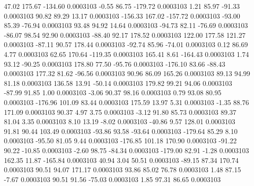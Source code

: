        47.02      175.67     -134.60     0.0003103
       -0.55       86.75     -179.72     0.0003103
        1.21       85.97      -91.33     0.0003103
       90.82       89.29       13.17     0.0003103
     -156.33      167.02     -157.72     0.0003103
      -93.00       85.39      -76.94     0.0003103
       93.48       94.92       14.64     0.0003103
      -94.73       82.11      -76.69     0.0003103
      -86.07       98.54       92.90     0.0003103
      -88.40       92.17      178.52     0.0003103
      122.00      177.58      121.27     0.0003103
      -87.11       90.57      178.44     0.0003103
      -92.74       85.96      -74.01     0.0003103
        0.12       86.69        4.77     0.0003103
       62.65      170.64     -119.35     0.0003103
      165.41        8.61     -164.43     0.0003103
        1.74       93.12      -90.25     0.0003103
      178.80       77.50      -95.76     0.0003103
     -176.10       83.66      -88.43     0.0003103
      177.32       81.62      -96.56     0.0003103
       90.96       86.09      165.26     0.0003103
       89.13       94.99       81.18     0.0003103
      136.58       13.91      -50.14     0.0003103
      179.82       99.21       94.06     0.0003103
      -87.99       91.85        1.00     0.0003103
       -3.06       90.37       98.16     0.0003103
        0.79       93.08       80.95     0.0003103
     -176.96      101.09       83.44     0.0003103
      175.59       13.97        5.31     0.0003103
       -1.35       88.76      171.09     0.0003103
       90.37        4.97        3.75     0.0003103
       -3.12       91.80       85.73     0.0003103
       89.37       81.04        3.35     0.0003103
        8.10       13.19       -8.02     0.0003103
      -40.86        9.57      128.01     0.0003103
       91.81       90.44      103.49     0.0003103
      -93.86       93.58      -93.64     0.0003103
     -179.64       85.29        8.10     0.0003103
      -95.50       81.05        9.44     0.0003103
     -176.85      101.18      170.90     0.0003103
      -91.22       90.22      -10.85     0.0003103
       -2.60       98.75      -84.34     0.0003103
     -179.00       82.91       -1.28     0.0003103
      162.35       11.87     -165.84     0.0003103
       40.94        3.04       50.51     0.0003103
      -89.15       87.34      170.74     0.0003103
       90.51       94.07      171.17     0.0003103
       93.86       85.02       76.78     0.0003103
        1.48       87.15       -7.67     0.0003103
       90.51       91.56      -75.03     0.0003103
        1.85       97.31       86.65     0.0003103
